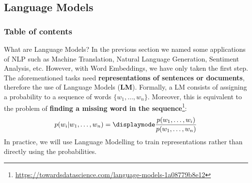 \documentclass[9pt]{beamer}
\begin{document}
\subsection{Language Models}
\begin{frame}
    \frametitle{Table of contents}
    \tableofcontents[currentsection]
\end{frame}

\begin{frame}{What are Language Models?}
    In the previous section we named some applications of NLP such as Machine Translation, Natural Language Generation, Sentiment Analysis, etc. However, with Word Embeddings, we have only taken the first step. \vspace{0.2cm}\\
    The aforementioned tasks need \textbf{representations of sentences or documents}, therefore the use of Language Models (\textbf{LM}). Formally, a LM consists of assigning a probability to a sequence of words $\{w_1,\dots,w_n\}$. Moreover, this is equivalent to the problem of \textbf{finding a missing word in the sequence}\footnote{\url{https://towardsdatascience.com/language-models-1a08779b8e12}}:
    $$ p(w_i|w_1,\dots,w_n) = \displaymode \frac{p(w_1,\dots,w_i)}{p(w_1,\dots,w_n)} $$
    In practice, we will use Language Modelling to train representations rather than directly using the probabilities.
\end{frame}
\end{document}
